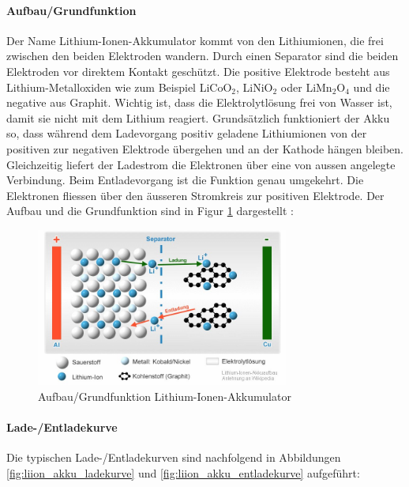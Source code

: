 \paragraph{Aufbau/Grundfunktion}
Der Name Lithium-Ionen-Akkumulator kommt von den Lithiumionen, die frei zwischen den beiden Elektroden wandern. Durch einen Separator sind die beiden Elektroden vor direktem Kontakt geschützt. Die positive Elektrode besteht aus Lithium-Metalloxiden wie zum Beispiel LiCoO$_2$, LiNiO$_2$ oder LiMn$_2$O$_4$ und die negative aus Graphit. Wichtig ist, dass die Elektrolytlösung frei von Wasser ist, damit sie nicht mit dem Lithium reagiert.
Grundsätzlich funktioniert der Akku so, dass während dem Ladevorgang positiv geladene Lithiumionen von der positiven zur negativen Elektrode übergehen und an der Kathode hängen bleiben. Gleichzeitig liefert der Ladestrom die Elektronen über eine von aussen angelegte Verbindung. Beim Entladevorgang ist die Funktion genau umgekehrt. Die Elektronen fliessen über den äusseren Stromkreis zur positiven Elektrode. Der Aufbau und die Grundfunktion sind in Figur \ref{fig:liion_akku} dargestellt \cite{liion_akku_aufbau_funktion2}:

\begin{figure}[h!]
	\centering
\includegraphics[width=0.74\textwidth]{images/aufbau_liion.jpg}
	\caption{Aufbau/Grundfunktion Lithium-Ionen-Akkumulator \cite{liion_akku_aufbau_funktion1}}
	\label{fig:liion_akku}
\end{figure}

\newpage

\paragraph{Lade-/Entladekurve}
Die typischen Lade-/Entladekurven sind nachfolgend in Abbildungen \ref{fig:liion_akku_ladekurve} und \ref{fig:liion_akku_entladekurve} aufgeführt:

